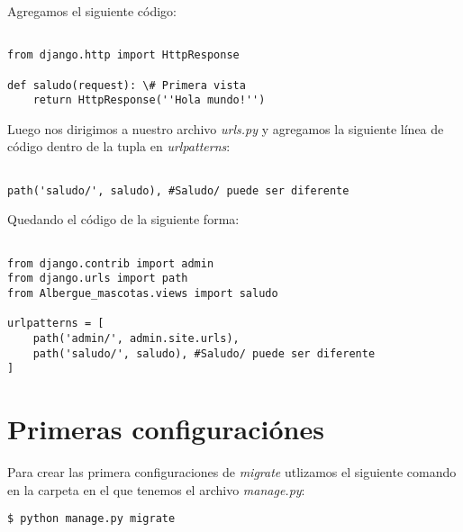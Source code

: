 \documentclass[12pt,letterpaper]{article}
\begin{document}
Agregamos el siguiente código:\\



\lstset{language=python, breaklines=true, basicstyle=\footnotesize}
\begin{lstlisting}[frame=single]

from django.http import HttpResponse

def saludo(request): \# Primera vista
    return HttpResponse(''Hola mundo!'')

\end{lstlisting}




Luego nos dirigimos a nuestro archivo \emph{urls.py} y agregamos la siguiente línea de código dentro de la tupla en \emph{urlpatterns}:




\lstset{language=python, breaklines=true, basicstyle=\footnotesize}
\begin{lstlisting}[frame=single]

path('saludo/', saludo), #Saludo/ puede ser diferente

\end{lstlisting}

Quedando el código de la siguiente forma:\\

\lstset{language=python, breaklines=true, basicstyle=\footnotesize}
\begin{lstlisting}[frame=single]

from django.contrib import admin
from django.urls import path
from Albergue_mascotas.views import saludo

urlpatterns = [
    path('admin/', admin.site.urls),
    path('saludo/', saludo), #Saludo/ puede ser diferente
]

\end{lstlisting}

\section{Primeras configuraciónes}

Para crear las primera configuraciones de \emph{migrate} utlizamos el siguiente comando en la carpeta en el que tenemos el archivo \emph{manage.py}:\\

\begin{verbatim}
$ python manage.py migrate
\end{verbatim}
\end{document}
